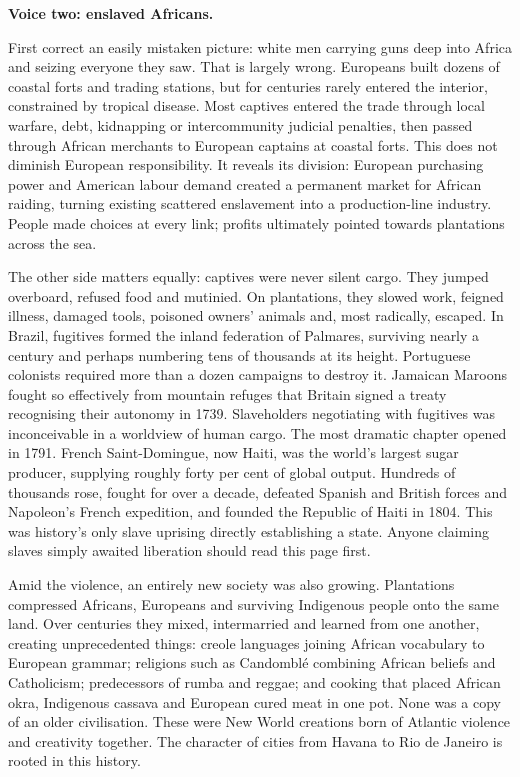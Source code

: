 \textbf{Voice two: enslaved Africans.}

First correct an easily mistaken picture: white men carrying guns deep into Africa and seizing everyone they saw. That is largely wrong. Europeans built dozens of coastal forts and trading stations, but for centuries rarely entered the interior, constrained by tropical disease. Most captives entered the trade through local warfare, debt, kidnapping or intercommunity judicial penalties, then passed through African merchants to European captains at coastal forts. This does not diminish European responsibility. It reveals its division: European purchasing power and American labour demand created a permanent market for African raiding, turning existing scattered enslavement into a production-line industry. People made choices at every link; profits ultimately pointed towards plantations across the sea.

The other side matters equally: captives were never silent cargo. They jumped overboard, refused food and mutinied. On plantations, they slowed work, feigned illness, damaged tools, poisoned owners' animals and, most radically, escaped. In Brazil, fugitives formed the inland federation of Palmares, surviving nearly a century and perhaps numbering tens of thousands at its height. Portuguese colonists required more than a dozen campaigns to destroy it. Jamaican Maroons fought so effectively from mountain refuges that Britain signed a treaty recognising their autonomy in 1739. Slaveholders negotiating with fugitives was inconceivable in a worldview of human cargo. The most dramatic chapter opened in 1791. French Saint-Domingue, now Haiti, was the world's largest sugar producer, supplying roughly forty per cent of global output. Hundreds of thousands rose, fought for over a decade, defeated Spanish and British forces and Napoleon's French expedition, and founded the Republic of Haiti in 1804. This was history's only slave uprising directly establishing a state. Anyone claiming slaves simply awaited liberation should read this page first.

Amid the violence, an entirely new society was also growing. Plantations compressed Africans, Europeans and surviving Indigenous people onto the same land. Over centuries they mixed, intermarried and learned from one another, creating unprecedented things: creole languages joining African vocabulary to European grammar; religions such as Candomblé combining African beliefs and Catholicism; predecessors of rumba and reggae; and cooking that placed African okra, Indigenous cassava and European cured meat in one pot. None was a copy of an older civilisation. These were New World creations born of Atlantic violence and creativity together. The character of cities from Havana to Rio de Janeiro is rooted in this history.

